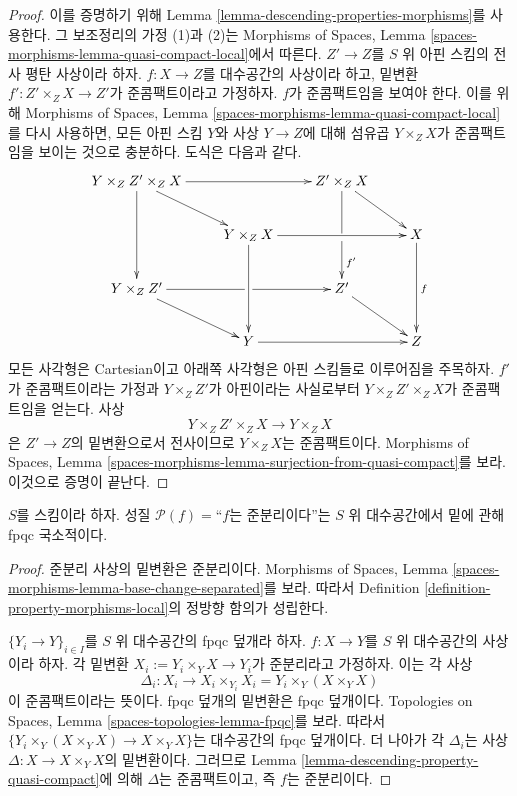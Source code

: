 \begin{proof}
이를 증명하기 위해 Lemma \ref{lemma-descending-properties-morphisms}를
사용한다. 그 보조정리의 가정 (1)과 (2)는 Morphisms of Spaces, Lemma
\ref{spaces-morphisms-lemma-quasi-compact-local}에서 따른다. $Z'\to Z$를
$S$ 위 아핀 스킴의 전사 평탄 사상이라 하자. $f:X\to Z$를 대수공간의
사상이라 하고, 밑변환 $f':Z'\times_ZX\to Z'$가 준콤팩트이라고
가정하자. $f$가 준콤팩트임을 보여야 한다. 이를 위해 Morphisms of
Spaces, Lemma \ref{spaces-morphisms-lemma-quasi-compact-local}를 다시
사용하면, 모든 아핀 스킴 $Y$와 사상 $Y\to Z$에 대해 섬유곱
$Y\times_ZX$가 준콤팩트임을 보이는 것으로 충분하다. 도식은 다음과 같다.
\begin{equation}
\label{equation-cube}
\vcenter{
\xymatrix{
Y \times_Z Z' \times_Z X \ar[dd] \ar[rr] \ar[rd] & &
Z' \times_Z X \ar'[d][dd]^{f'} \ar[rd] \\
& Y \times_Z X \ar[dd] \ar[rr] & & X \ar[dd]^f \\
Y \times_Z Z' \ar'[r][rr] \ar[rd] & & Z' \ar[rd] \\
& Y \ar[rr] & & Z
}
}
\end{equation}
모든 사각형은 Cartesian이고 아래쪽 사각형은 아핀 스킴들로 이루어짐을
주목하자. $f'$가 준콤팩트이라는 가정과 $Y\times_ZZ'$가 아핀이라는
사실로부터 $Y\times_ZZ'\times_ZX$가 준콤팩트임을 얻는다. 사상
$$
Y \times_Z Z' \times_Z X \longrightarrow Y \times_Z X
$$
은 $Z'\to Z$의 밑변환으로서 전사이므로 $Y\times_ZX$는 준콤팩트이다.
Morphisms of Spaces, Lemma
\ref{spaces-morphisms-lemma-surjection-from-quasi-compact}를 보라. 이것으로
증명이 끝난다.
\end{proof}

\begin{lemma}
\label{lemma-descending-property-quasi-separated}
$S$를 스킴이라 하자. 성질 $\mathcal{P}(f)=$``$f$는 준분리이다''는
$S$ 위 대수공간에서 밑에 관해 fpqc 국소적이다.
\end{lemma}

\begin{proof}
준분리 사상의 밑변환은 준분리이다. Morphisms of Spaces, Lemma
\ref{spaces-morphisms-lemma-base-change-separated}를 보라. 따라서
Definition \ref{definition-property-morphisms-local}의 정방향 함의가
성립한다.

\medskip\noindent
$\{Y_i\to Y\}_{i\in I}$를 $S$ 위 대수공간의 fpqc 덮개라 하자.
$f:X\to Y$를 $S$ 위 대수공간의 사상이라 하자. 각 밑변환
$X_i:=Y_i\times_YX\to Y_i$가 준분리라고 가정하자. 이는 각 사상
$$
\Delta_i:
X_i
\longrightarrow
X_i \times_{Y_i} X_i = Y_i \times_Y (X \times_Y X)
$$
이 준콤팩트이라는 뜻이다. fpqc 덮개의 밑변환은 fpqc 덮개이다.
Topologies on Spaces, Lemma \ref{spaces-topologies-lemma-fpqc}를 보라.
따라서 $\{Y_i\times_Y(X\times_YX)\to X\times_YX\}$는 대수공간의
fpqc 덮개이다. 더 나아가 각 $\Delta_i$는 사상
$\Delta:X\to X\times_YX$의 밑변환이다. 그러므로 Lemma
\ref{lemma-descending-property-quasi-compact}에 의해 $\Delta$는
준콤팩트이고, 즉 $f$는 준분리이다.
\end{proof}

